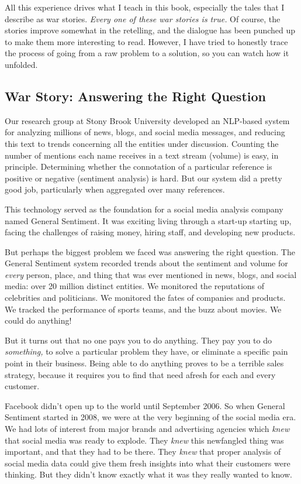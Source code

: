\documentclass[10pt]{article}
\begin{document}
All this experience drives what I teach in this book, especially the tales that I describe as war stories. \textit{Every one of these war stories is true.} Of course, the stories improve somewhat in the retelling, and the dialogue has been punched up to make them more interesting to read. However, I have tried to honestly trace the process of going from a raw problem to a solution, so you can watch how it unfolded.

\subsection{War Story: Answering the Right Question}
Our research group at Stony Brook University developed an NLP-based system for analyzing millions of news, blogs, and social media messages, and reducing this text to trends concerning all the entities under discussion. Counting the number of mentions each name receives in a text stream (volume) is easy, in principle. Determining whether the connotation of a particular reference is positive or negative (sentiment analysis) is hard. But our system did a pretty good job, particularly when aggregated over many references.

This technology served as the foundation for a social media analysis company named General Sentiment. It was exciting living through a start-up starting up, facing the challenges of raising money, hiring staff, and developing new products.

But perhaps the biggest problem we faced was answering the right question. The General Sentiment system recorded trends about the sentiment and volume for \emph{every} person, place, and thing that was ever mentioned in news, blogs, and social media: over 20 million distinct entities. We monitored the reputations of celebrities and politicians. We monitored the fates of companies and products. We tracked the performance of sports teams, and the buzz about movies. We could do anything!

But it turns out that no one pays you to do anything. They pay you to do \emph{something,} to solve a particular problem they have, or eliminate a specific pain point in their business. Being able to do anything proves to be a terrible sales strategy, because it requires you to find that need afresh for each and every customer.

Facebook didn't open up to the world until September 2006. So when General Sentiment started in 2008, we were at the very beginning of the social media era. We had lots of interest from major brands and advertising agencies which \emph{knew} that social media was ready to explode. They \emph{knew} this newfangled thing was important, and that they had to be there. They \emph{knew} that proper analysis of social media data could give them fresh insights into what their customers were thinking. But they didn't know exactly what it was they really wanted to know.
\end{document}
